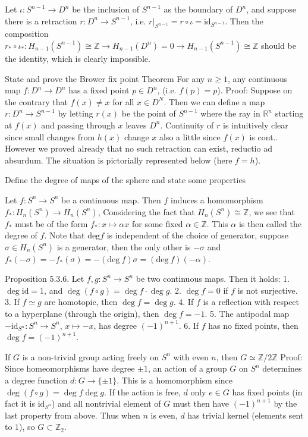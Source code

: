Let \(\iota : S^{n-1} \to D^n\) be the inclusion of \(S^{n-1}\) as the boundary of \(D^n\), 
and suppose there is a retraction \(r : D^n \to S^{n-1}\), i.e. \(r|_{S^{n-1}} = r \circ \iota = \text{id}_{S^{n-1}}\). 
Then the composition
\(r_* \circ \iota_* : H_{n-1}(S^{n-1}) \cong \mathbb{Z} \to H_{n-1}(D^n) = 0 \to H_{n-1}(S^{n-1}) \cong \mathbb{Z}\)
should be the identity, which is clearly impossible.


State and prove the Brower fix point Theorem
For any \( n \geq 1 \), any continuous map \( f : D^n \to D^n \)
has a fixed point \( p \in D^n \), (i.e. \(f(p) = p\)).
Proof: 
Suppose on the contrary that \(f(x) \neq x\) for all \(x \in D^N\). 
Then we can define a map \(r: D^n \to S^{n-1}\) by letting \(r(x)\) be the point of \(S^{n-1}\) where the ray in \(\mathbb{R}^n\) starting at \(f(x)\) and passing through 
\(x\) leaves \(D^n\). Continuity of \(r\) is intuitively clear since small changes from \( h(x) \) change \( x \) also a little since \( f(x) \) is cont.. 
However we proved already that no such retraction can exist, reductio ad absurdum.
The situation is pictorially represented below (here \( f = h \)).


Define the degree of maps of the sphere and state some properties

Let \(f: S^n\to S^n\) be a continuous map. Then \(f\) induces a homomorphism \(f_*\colon H_n\left(S^n\right) \to H_n\left(S^n\right)\), 
Considering the fact that \(H_n\left(S^n\right)\cong\mathbb{Z}\), we see that \(f_*\) must be of the form \(f_*\colon x\mapsto\alpha x\) 
for some fixed \(\alpha\in\mathbb{Z}\). This \(\alpha\) is then called the degree of \(f\).
Note that \( \text{deg} f \) is independent of the choice of generator, suppose \( \sigma \in H_n(S^n) \) is a generator,
then the only other is \( - \sigma \) and \( f_{\ast}(-\sigma) = -f_{\ast}(\sigma) = - (\text{deg}\ f)\sigma = (\text{deg}\ f)(- \alpha) \).

Proposition 5.3.6. 
Let \(f, g: S^n \to S^n\) be two continuous maps. Then it holds:
1. \(\deg \text{id} = 1\), and \(\deg (f \circ g) = \deg f \cdot \deg g\).
2. \(\deg f = 0\) if \(f\) is not surjective.
3. If \(f \simeq g\) are homotopic, then \(\deg f = \deg g\).
4. If \(f\) is a reflection with respect to a hyperplane (through the origin), then \(\deg f = -1\).
5. The antipodal map \(-\text{id}_{S^n}: S^n \to S^n\), \(x \mapsto -x\), has degree \((-1)^{n+1}\).
6. If \(f\) has no fixed points, then \(\deg f = (-1)^{n+1}\).

If \( G \) is a non-trivial group acting freely on \( S^n \) with even \( n \), then \( G \simeq \mathbb{Z}/2\mathbb{Z} \)
Proof:
Since homeomorphisms have degree \(\pm 1\), an action of a group \(G\) on \(S^n\) determines a degree function \(d: G \to \{\pm 1\}\). 
This is a homomorphism since \(\deg (f \circ g) = \deg f \deg g\). 
If the action is free, \(d\) only \( e \in G \) has fixed points (in fact it is \( \text{id}_{S^n} \)) 
and all nontrivial element of \(G\) must then have \((-1)^{n+1}\) by the last property from above. 
Thus when \(n\) is even, \(d\) has trivial kernel (elements sent to \( 1 \)), so \(G \subset \mathbb{Z}_2\).


